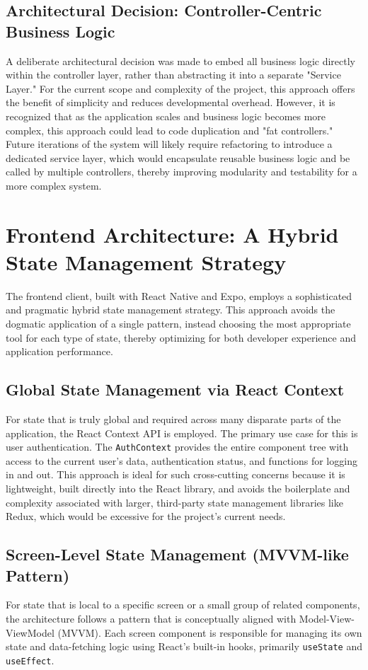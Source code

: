 \subsection{Architectural Decision: Controller-Centric Business Logic}
A deliberate architectural decision was made to embed all business logic directly within the controller layer, rather than abstracting it into a separate "Service Layer." For the current scope and complexity of the project, this approach offers the benefit of simplicity and reduces developmental overhead. However, it is recognized that as the application scales and business logic becomes more complex, this approach could lead to code duplication and "fat controllers." Future iterations of the system will likely require refactoring to introduce a dedicated service layer, which would encapsulate reusable business logic and be called by multiple controllers, thereby improving modularity and testability for a more complex system.

\section{Frontend Architecture: A Hybrid State Management Strategy}

The frontend client, built with React Native and Expo, employs a sophisticated and pragmatic hybrid state management strategy. This approach avoids the dogmatic application of a single pattern, instead choosing the most appropriate tool for each type of state, thereby optimizing for both developer experience and application performance.

\subsection{Global State Management via React Context}
For state that is truly global and required across many disparate parts of the application, the React Context API is employed. The primary use case for this is user authentication. The \texttt{AuthContext} provides the entire component tree with access to the current user's data, authentication status, and functions for logging in and out. This approach is ideal for such cross-cutting concerns because it is lightweight, built directly into the React library, and avoids the boilerplate and complexity associated with larger, third-party state management libraries like Redux, which would be excessive for the project's current needs.

\subsection{Screen-Level State Management (MVVM-like Pattern)}
For state that is local to a specific screen or a small group of related components, the architecture follows a pattern that is conceptually aligned with Model-View-ViewModel (MVVM). Each screen component is responsible for managing its own state and data-fetching logic using React's built-in hooks, primarily \texttt{useState} and \texttt{useEffect}.

